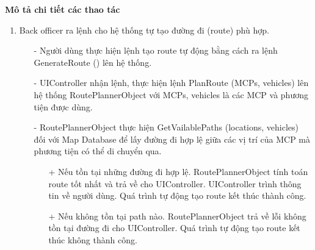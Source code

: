        \textbf{Mô tả chi tiết các thao tác}
        \begin{enumerate}
            \item Back officer ra lệnh cho hệ thống tự tạo đường đi (route) phù hợp.
            \begin{itemize}
                \item[-] Người dùng thực hiện lệnh tạo route tự động bằng cách ra lệnh GenerateRoute () lên hệ thống.
                \item[-] UIController nhận lệnh, thực hiện lệnh PlanRoute (MCPs, vehicles) lên hệ thống RoutePlannerObject với MCPs, vehicles là các MCP và phương tiện được dùng.
                \item[-] RoutePlannerObject thực hiện GetVailablePaths (locations, vehicles) đối với Map Database để lấy đường đi hợp lệ giữa các vị trí của MCP mà phương tiện có thể di chuyển qua.
                \begin{itemize}
                    \item[+] Nếu tồn tại những đường đi hợp lệ. RoutePlannerObject tính toán route tốt nhất và trả về cho UIController. UIController trình thông tin về người dùng. Quá trình tự động tạo route kết thúc thành công.
                    \item[+] Nếu không tồn tại path nào. RoutePlannerObject trả về lỗi không tồn tại đường đi cho UIController. Quá trình tự động tạo route kết thúc không thành công.
                \end{itemize}
            \end{itemize}
        

\end{enumerate}
